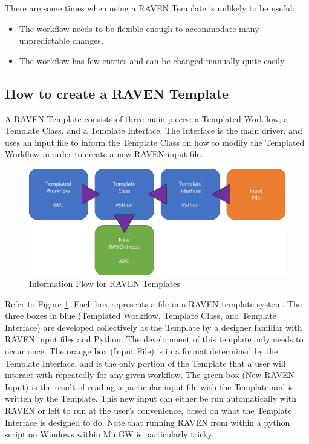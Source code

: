 There are some times when using a RAVEN Template is unlikely to be useful:
\begin{itemize}
  \item The workflow needs to be flexible enough to accommodate many unpredictable changes,
  \item The workflow has few entries and can be changed manually quite easily.
\end{itemize}

\subsection{How to create a RAVEN Template}
A RAVEN Template consists of three main pieces: a Templated Workflow, a Template Class, and a Template Interface. The Interface is the main driver, and uses an input file to inform the Template Class on how to modify the Templated Workflow in order to create a new RAVEN input file.

\begin{figure}[h!]
 \centering
 \includegraphics[width=\textwidth]{pics/TemplateWorkflow.png}
 \caption{Information Flow for RAVEN Templates}
 \label{fig:raven template workflow}
\end{figure}

Refer to Figure \ref{fig:raven template workflow}. Each box represents a file in a RAVEN template system. The three boxes in blue (Templated Workflow, Template Class, and Template Interface) are developed collectively as the Template  by a designer familiar with RAVEN input files and Python. The development of this template only needs to occur once. The orange box (Input File) is in a format determined by the Template Interface, and is the only portion of the Template that a user will interact with repeatedly for any given workflow. The green box (New RAVEN Input) is the result of reading a particular input file with the Template and is written by the Template. This new input can either be run automatically with RAVEN or left to run at the user's convenience, based on what the Template Interface is designed to do. Note that running RAVEN from within a python script on Windows within MinGW is particularly tricky.
\\

